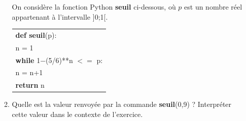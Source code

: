 \documentclass[10pt]{article}
\begin{document}
\begin{enumerate}
\begin{enumerate}
On considère la fonction Python \textbf{seuil} ci-dessous, où $p$ est un nombre réel appartenant à l’intervalle ]0;1[.
\begin{center}
\begin{tabular}[]{|l|}
\hline
\textbf{def seuil}(p):\\
\hspace{2em}n = 1\\
\hspace{2em}\textbf{while} 1$-$(5/6)**n $< =$ p:\\
\hspace{4.5em}n = n+1\\
\hspace{2em}\textbf{return} n\\
\hline
\end{tabular}
\end{center}

		\item Quelle est la valeur renvoyée par la commande \textbf{seuil}(0,9) ? Interpréter cette valeur dans le contexte de l’exercice.
	\end{enumerate}
\end{enumerate}

\bigskip
\end{document}

